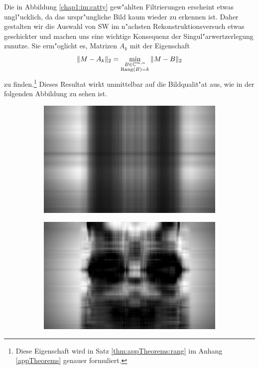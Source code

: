 Die in Abbildung \ref{chap1:im:catty} gew"ahlten Filtrierungen erscheint etwas ungl"ucklich, da das urspr"ungliche Bild kaum wieder zu erkennen ist.
Daher gestalten wir die Auswahl von SW im n"achsten Rekonstruktionsversuch etwas geschickter und machen uns eine wichtige Konsequenz der Singul"arwertzerlegung zunutze. Sie erm"oglicht es, Matrizen $A_k$ mit der Eigenschaft
\[
\|M - A_k \|_2 = \min_{\substack{B\in\mathbb{C}^{m,n} \\ \text{Rang}(B)=k}} \|M - B\|_2
\]
zu finden.\footnote{Diese Eigenschaft wird in Satz \ref{thm:appTheorems:rang} im Anhang \ref{appTheorems} genauer formuliert.} Dieses Resultat wirkt unmittelbar auf die Bildqualit"at aus, wie in der folgenden Abbildung zu sehen ist.
\newpage

\begin{figure}[h!]
\center
\begin{subfigure}[c]{.3\textwidth}
\includegraphics[width=.9\linewidth]{images/Cat1}
\end{subfigure}
\begin{subfigure}[c]{.3\textwidth}
\includegraphics[width=.9\linewidth]{images/Cat5}

\end{subfigure}
\end{figure}
